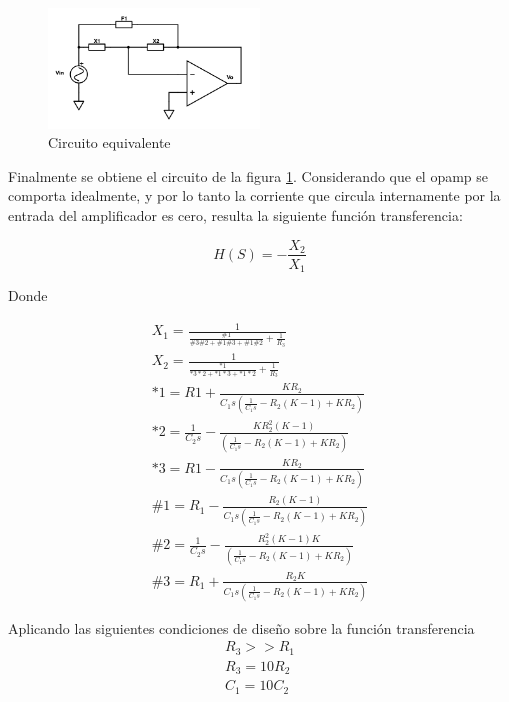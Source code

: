 \documentclass[../../tc_tp3_main.tex]{subfiles}
\begin{document}
\begin{figure}[H]
\centering
\includegraphics[width=0.5\textwidth]{imagenes/simplFin.png}
\caption{Circuito equivalente} \label{fig:csFin}
\end{figure}

Finalmente se obtiene el circuito de la figura \ref{fig:csFin}. Considerando que el opamp se comporta idealmente, y por lo tanto la corriente que circula internamente por la entrada del amplificador es cero, resulta la siguiente función transferencia:

\begin{equation}
H(S)=- \frac{X_2}{X_1}\label{eq:circuitoRed}
\end{equation}

Donde

\begin{gather}
X_1= \frac{1}{\frac{\# 1}{\#3 \# 2 + \#1 \#3 + \# 1 \# 2}+\frac{1}{R_3}}  \\
X_2= \frac{1}{\frac{* 1}{*3 * 2 + *1 *3 + * 1 * 2}+\frac{1}{R_3}} \\
*1=R1 +\frac{KR_2}{C_1 s \left(         \frac{1}{C_1 s} - R_2(K-1)+KR_2                 \right)}\\
*2=\frac{1}{C_2 s} -\frac{KR_2^2 (K-1)}{ \left(         \frac{1}{C_1 s} - R_2(K-1)+KR_2                 \right)}\\
*3=R1 -\frac{KR_2}{C_1 s \left(         \frac{1}{C_1 s} - R_2(K-1)+KR_2                 \right)}\\
\#1=R_1 - \frac{R_2(K-1)}{C_1 s \left(  \frac{1}{C_1 s} - R_2 (K-1) + KR_2     \right)}\\
\#2=\frac{1}{C_2 s}- \frac{R_2^2(K-1)K}{ \left(  \frac{1}{C_1 s} - R_2 (K-1) + KR_2     \right)}\\
\#3=R_1 + \frac{R_2K}{C_1 s \left(  \frac{1}{C_1 s} - R_2 (K-1) + KR_2     \right)}
\end{gather}

Aplicando las siguientes condiciones de diseño sobre la función transferencia
\begin{gather}
 R_3 >> R_1   \\
 R_3 =10 R_2   \\
C_1=10C_2
\end{gather}
\end{document}
